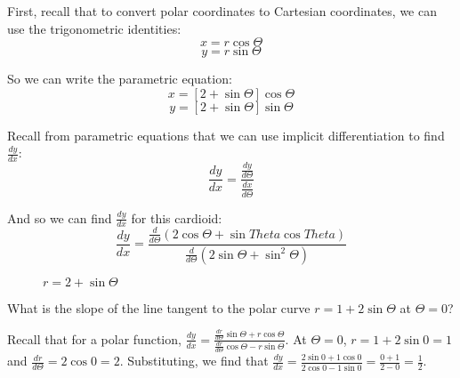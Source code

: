 First, recall that to convert polar coordinates to Cartesian coordinates, we can use the trigonometric identities:
$$x = r\cos{\Theta}$$
$$y = r\sin{\Theta}$$

So we can write the parametric equation:
$$x = \left[2 + \sin{\Theta} \right]\cos{\Theta}$$
$$y = \left[ 2 + \sin{\Theta} \right]\sin{\Theta}$$

Recall from parametric equations that we can use implicit differentiation to find $\frac{dy}{dx}$:
$$\frac{dy}{dx} = \frac{\frac{dy}{d\Theta}}{\frac{dx}{d\Theta}}$$

And so we can find $\frac{dy}{dx}$ for this cardioid:
$$\frac{dy}{dx} = \frac{\frac{d}{d\Theta} \left(2\cos{\Theta} + \sin{Theta}\cos{Theta} \right)}{\frac{d}{d\Theta} \left(2\sin{\Theta} + \sin^2{\Theta} \right)}$$

\begin{figure}
\centering
    \label{cardioid}
    \caption{$r = 2 + \sin{\Theta}$}
    \end{figure}


\begin{Exercise} What is the slope of the line 
tangent to the polar curve $r = 1 + 2\sin{\Theta}$ at $\Theta = 0$?
\end{Exercise}

\begin{Answer}[ref = polar1]
Recall that for a polar function, $\frac{dy}{dx} = \frac{\frac{dr}{d\Theta}
\sin{\Theta} + r\cos{\Theta}}{\frac{dr}{d\Theta}\cos{\Theta} - r\sin{\Theta}}$. 
At $\Theta = 0$, $r = 1 + 2\sin{0} = 1$ and $\frac{dr}{d\Theta} = 2\cos{0} = 
2$. Substituting, we find that $\frac{dy}{dx} = \frac{2\sin{0} + 1\cos{0}}{2
\cos{0} - 1\sin{0}} = \frac{0 + 1}{2 - 0} = \frac{1}{2}$. 
\end{Answer}

